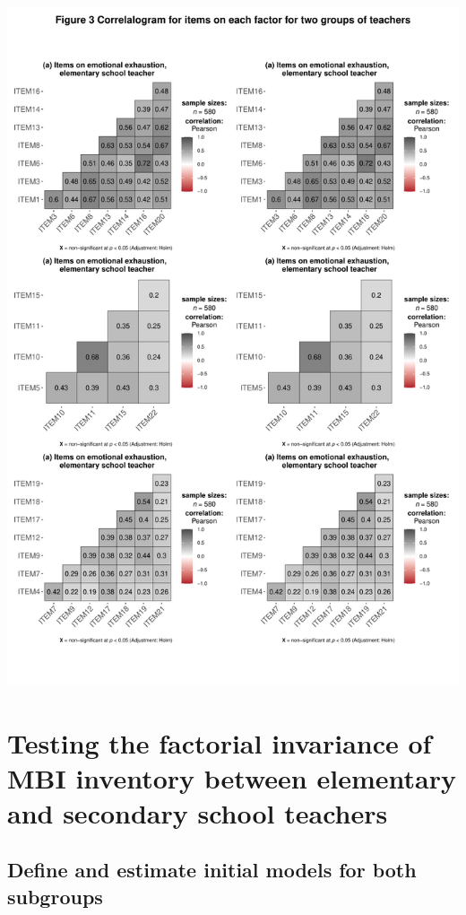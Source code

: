 \documentclass[
]{article}
\begin{document}
\begin{center}\includegraphics{Assignment5_RongGuang_files/figure-latex/unnamed-chunk-16-1} \end{center}

\hypertarget{testing-the-factorial-invariance-of-mbi-inventory-between-elementary-and-secondary-school-teachers}{%
\section{Testing the factorial invariance of MBI inventory between elementary and secondary school teachers}\label{testing-the-factorial-invariance-of-mbi-inventory-between-elementary-and-secondary-school-teachers}}

\hypertarget{define-and-estimate-initial-models-for-both-subgroups}{%
\subsection{Define and estimate initial models for both subgroups}\label{define-and-estimate-initial-models-for-both-subgroups}}
\end{document}
